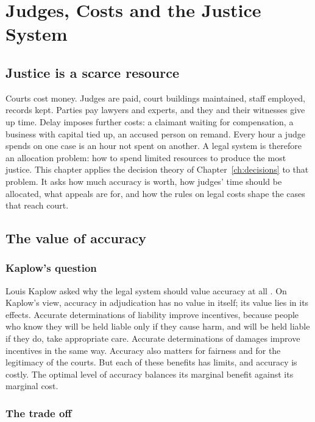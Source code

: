 \chapter{Judges, Costs and the Justice System}
\label{ch:systemcosts}

\section{Justice is a scarce resource}

Courts cost money. Judges are paid, court buildings maintained, staff employed, records kept. Parties pay lawyers and experts, and they and their witnesses give up time. Delay imposes further costs: a claimant waiting for compensation, a business with capital tied up, an accused person on remand. Every hour a judge spends on one case is an hour not spent on another. A legal system is therefore an allocation problem: how to spend limited resources to produce the most justice. This chapter applies the decision theory of Chapter~\ref{ch:decisions} to that problem. It asks how much accuracy is worth, how judges' time should be allocated, what appeals are for, and how the rules on legal costs shape the cases that reach court.

\section{The value of accuracy}

\subsection{Kaplow's question}

Louis Kaplow asked why the legal system should value accuracy at all \citep{kaplow1994}. On Kaplow's view, accuracy in adjudication has no value in itself; its value lies in its effects. Accurate determinations of liability improve incentives, because people who know they will be held liable only if they cause harm, and will be held liable if they do, take appropriate care. Accurate determinations of damages improve incentives in the same way. Accuracy also matters for fairness and for the legitimacy of the courts. But each of these benefits has limits, and accuracy is costly. The optimal level of accuracy balances its marginal benefit against its marginal cost.

\subsection{The trade off}

